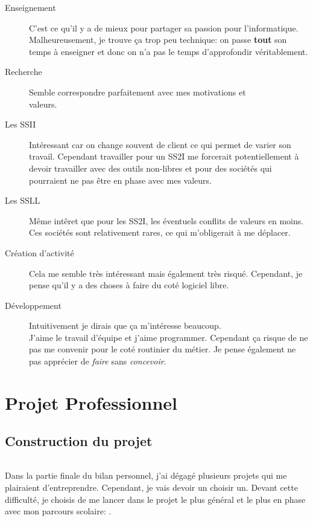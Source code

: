 \documentclass[a4paper,12pt, draft]{report}
\newcommand{\tabTitle}[1]{\hfill{} \textsc{#1} \hfill{} }
\begin{document}
\begin{description}
\item [Enseignement] C'est ce qu'il y a de mieux pour partager sa passion pour l'informatique. Malheureusement, je trouve ça trop peu technique: on passe \textbf{tout} son temps à enseigner et donc on n'a pas le temps d'approfondir véritablement.

\item [Recherche] Semble correspondre parfaitement avec mes motivations et\\ valeurs.

\item [Les SSII] Intéressant car on change souvent de client ce qui permet de varier son travail. Cependant travailler pour un SS2I me forcerait potentiellement à devoir travailler avec des outils non-libres et pour des sociétés qui pourraient ne pas être en phase avec mes valeurs.

\item [Les SSLL] Même intêret que pour les SS2I, les éventuels conflits de valeurs en moins. Ces sociétés sont relativement rares\cite{annuaire_ssll}, ce qui m'obligerait à me déplacer.
 
\item [Création d'activité] Cela me semble très intéressant mais également très risqué. Cependant, je pense qu'il y a des choses à faire du coté logiciel libre.

\item [Développement] Intuitivement je dirais que ça m'intéresse beaucoup. \\J'aime le travail d'équipe et j'aime programmer. Cependant ça risque de ne pas me convenir pour le coté routinier du métier. Je pense également ne pas apprécier de \textit{faire} sans \textit{concevoir}.
\end{description}


\part{Projet Professionnel}

\chapter{Construction du projet}
\paragraph{}
Dans la partie finale du bilan personnel, j'ai dégagé plusieurs projets qui me plairaient d'entreprendre. Cependant, je vais devoir un choisir un. Devant cette difficulté, je choisis de me lancer dans le projet le plus général et le plus en phase avec mon parcours scolaire: \tabTitle{}. \\
\end{document}
